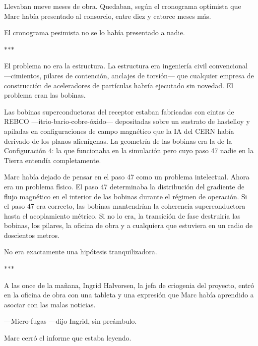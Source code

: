 \documentclass[11pt,a5paper,twoside]{book}
\begin{document}
Llevaban nueve meses de obra. Quedaban, según el cronograma optimista que Marc había presentado al consorcio, entre diez y catorce meses más.

El cronograma pesimista no se lo había presentado a nadie.

\vspace{1.5em}
\begin{center}$\ast$\quad$\ast$\quad$\ast$\end{center}
\vspace{1.5em}

El problema no era la estructura. La estructura era ingeniería civil convencional —cimientos, pilares de contención, anclajes de torsión— que cualquier empresa de construcción de aceleradores de partículas habría ejecutado sin novedad. El problema eran las bobinas.

Las bobinas superconductoras del receptor estaban fabricadas con cintas de REBCO —itrio-bario-cobre-óxido— depositadas sobre un sustrato de hastelloy y apiladas en configuraciones de campo magnético que la IA del CERN había derivado de los planos alienígenas. La geometría de las bobinas era la de la Configuración 4: la que funcionaba en la simulación pero cuyo paso 47 nadie en la Tierra entendía completamente.

Marc había dejado de pensar en el paso 47 como un problema intelectual. Ahora era un problema físico. El paso 47 determinaba la distribución del gradiente de flujo magnético en el interior de las bobinas durante el régimen de operación. Si el paso 47 era correcto, las bobinas mantendrían la coherencia superconductora hasta el acoplamiento métrico. Si no lo era, la transición de fase destruiría las bobinas, los pilares, la oficina de obra y a cualquiera que estuviera en un radio de doscientos metros.

No era exactamente una hipótesis tranquilizadora.

\vspace{1.5em}
\begin{center}$\ast$\quad$\ast$\quad$\ast$\end{center}
\vspace{1.5em}

A las once de la mañana, Ingrid Halvorsen, la jefa de criogenia del proyecto, entró en la oficina de obra con una tableta y una expresión que Marc había aprendido a asociar con las malas noticias.

—Micro-fugas —dijo Ingrid, sin preámbulo.

Marc cerró el informe que estaba leyendo.
\end{document}
